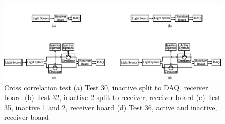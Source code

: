 \begin{figure}[!ht]
\centering
\includegraphics[width=0.9\linewidth]{4-ANC_Sys/CrossCoTest.pdf}
\caption{Cross correlation test (a) Test 30, inactive split to DAQ, receiver board (b) Test 32, inactive 2 split to receiver, receiver board (c) Test 35, inactive 1 and 2, receiver board (d) Test 36, active and inactive, receiver board}
\label{fig_CrossCoTest}
\end{figure}

